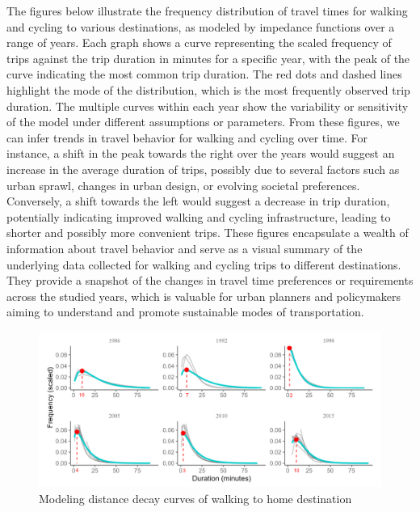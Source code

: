 \documentclass[
11pt, %
oneside, %
english, %
singlespacing, %
]{macthesis} %
\begin{document}
The figures below illustrate the frequency distribution of travel times for walking and cycling to various destinations, as modeled by impedance functions over a range of years. Each graph shows a curve representing the scaled frequency of trips against the trip duration in minutes for a specific year, with the peak of the curve indicating the most common trip duration. The red dots and dashed lines highlight the mode of the distribution, which is the most frequently observed trip duration. The multiple curves within each year show the variability or sensitivity of the model under different assumptions or parameters.
From these figures, we can infer trends in travel behavior for walking and cycling over time. For instance, a shift in the peak towards the right over the years would suggest an increase in the average duration of trips, possibly due to several factors such as urban sprawl, changes in urban design, or evolving societal preferences. Conversely, a shift towards the left would suggest a decrease in trip duration, potentially indicating improved walking and cycling infrastructure, leading to shorter and possibly more convenient trips.
These figures encapsulate a wealth of information about travel behavior and serve as a visual summary of the underlying data collected for walking and cycling trips to different destinations. They provide a snapshot of the changes in travel time preferences or requirements across the studied years, which is valuable for urban planners and policymakers aiming to understand and promote sustainable modes of transportation.

\newpage
\begin{landscape}
\centering

\begin{figure}
\includegraphics[width=1.1\linewidth]{figure/ch03-Fig03} \caption{Modeling distance decay curves of walking to home destination}\label{fig:home-wi}
\end{figure}
\end{landscape}
\clearpage
\end{document}
